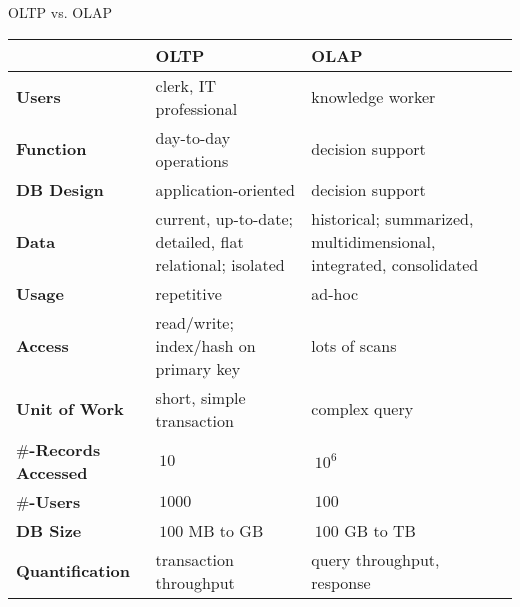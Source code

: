 \begin{frame}{OLTP vs. OLAP}
	\begin{tabularx}{\textwidth}{|l|X|X|}
		                               & \textbf{OLTP}                                            & \textbf{OLAP}                                                      \\\hline
		\textbf{Users}                 & clerk, IT professional                                   & knowledge worker                                                   \\
		\textbf{Function}              & day-to-day operations                                    & decision support                                                   \\
		\textbf{DB Design}             & application-oriented                                     & decision support                                                   \\
		\textbf{Data}                  & current, up-to-date; detailed, flat relational; isolated & historical; summarized, multidimensional, integrated, consolidated \\
		\textbf{Usage}                 & repetitive                                               & ad-hoc                                                             \\
		\textbf{Access}                & read/write; index/hash on primary key                    & lots of scans                                                      \\
		\textbf{Unit of Work}          & short, simple transaction                                & complex query                                                      \\
		\textbf{$\#$-Records Accessed} & $~ 10$                                                   & $~ 10^6$                                                           \\
		\textbf{$\#$-Users}            & $~ 1000$                                                 & $~ 100$                                                            \\
		\textbf{DB Size}               & $~ 100$ MB to GB                                         & $~ 100$ GB to TB                                                   \\
		\textbf{Quantification}        & transaction throughput                                   & query throughput, response                                         \\
	\end{tabularx}
\end{frame}

